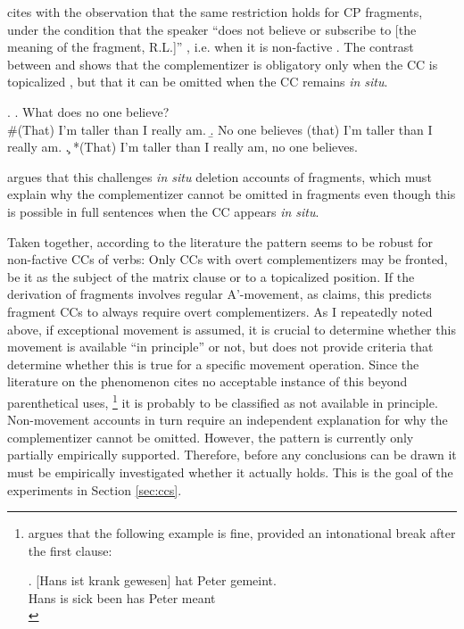 \citet{merchant2004} cites \citet{morgan1973} with the observation that the same restriction holds for CP fragments, under the condition that the speaker ``does not believe or subscribe to [the meaning of the fragment, R.L.]'' \citep[690]{merchant2004}, i.e. when it is non-factive \Next[a]. The contrast between \Next[b] and \Next[c] shows that the complementizer is obligatory only when the CC is topicalized \Next[c], but that it can be omitted when the CC remains \textit{in situ}. 

\ex.
\a. What does no one believe? \hfill \citep[690]{merchant2004}\\
\mbox{}\hspace{-.45em}\#(That) I’m taller than I really am.
\b. No one believes (that) I'm taller than I really am. \label{ex:merchant-cc-insitu}
\c. *(That) I’m taller than I really am, no one believes. \label{ex:merchant-cc-fronted}

\citeauthor{merchant2004} argues that this challenges \textit{in situ} deletion accounts of fragments, which must explain why the complementizer cannot be omitted in fragments even though this is possible in full sentences when the CC appears \textit{in situ}.

Taken together, according to the literature the pattern seems to be robust for non-factive CCs of verbs: Only CCs with overt complementizers may be fronted, be it as the subject of the matrix clause or to a topicalized position. If the derivation of fragments involves regular A'-movement, as \citet{merchant2004} claims, this predicts fragment CCs to always require overt complementizers. As I repeatedly noted above, if exceptional movement is assumed, it is crucial to determine whether this movement is available ``in principle'' or not, but \citet{weir2014} does not provide criteria that determine whether this is true for a specific movement operation. Since the literature on the phenomenon cites no acceptable instance of this beyond parenthetical uses,%
\footnote{\citet{webelhuth1992} argues that the following example is fine, provided an intonational break after the first clause:

\exg. [Hans ist krank gewesen] hat Peter gemeint.\\
Hans is sick been has Peter meant\\
 

}\afterfn%
%
it is probably to be classified as not available in principle. Non-movement accounts in turn require an independent explanation for why the complementizer cannot be omitted. However, the pattern is currently only partially empirically supported. Therefore, before any conclusions can be drawn it must be empirically investigated whether it actually holds. This is the goal of the experiments in Section \ref{sec:ccs}. 

